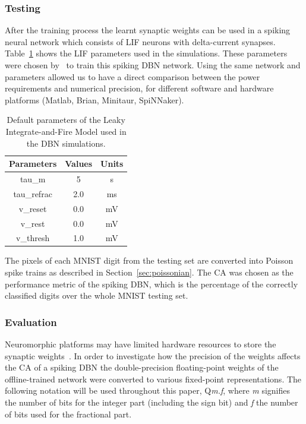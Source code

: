 \documentclass{frontiersENG} %
\begin{document}
\subsubsection{Testing}
After the training process the learnt synaptic weights can be used in a spiking neural network which consists of LIF neurons with delta-current synapses. Table~\ref{Tab:NeuralParams} shows the LIF parameters used in the simulations.
These parameters were chosen by~\cite{o2013real} to train this spiking DBN network. 
Using the same network and parameters allowed us to have a direct comparison between the power requirements and numerical precision, for different software and hardware platforms (Matlab, Brian, Minitaur, SpiNNaker).

\begin{table}[hbbp]
	\centering
	\caption{\label{Tab:NeuralParams}Default parameters of the Leaky Integrate-and-Fire Model used in the DBN simulations.}
	\bgroup
	\def\arraystretch{1.3}
	\begin{tabular}{c c c}
		Parameters & Values & Units \\
		\hline
		tau\_m & 5 & s\\
		tau\_refrac & 2.0 & ms\\
		v\_reset & 0.0 & mV\\
		v\_rest & 0.0 & mV\\
		v\_thresh & 1.0 & mV\\
	\end{tabular}
	\egroup
\end{table}

The pixels of each MNIST digit from the testing set are converted into Poisson spike trains as described in Section~\ref{sec:poissonian}. %
The CA was chosen as the performance metric of the spiking DBN, which is the percentage of the correctly classified digits over the whole MNIST testing set.

\subsubsection{Evaluation}
Neuromorphic platforms may have limited hardware resources to store the synaptic weights~\citep{schemmel2010wafer,merolla2014million}. In order to investigate how the precision of the weights affects the CA of a spiking DBN the double-precision floating-point weights of the offline-trained network were converted to various fixed-point representations. The following notation will be used throughout this paper, Q\textit{m.f}, where \textit{m} signifies the number of bits for the integer part (including the sign bit) and \textit{f} the number of bits used for the fractional part.
\end{document}
